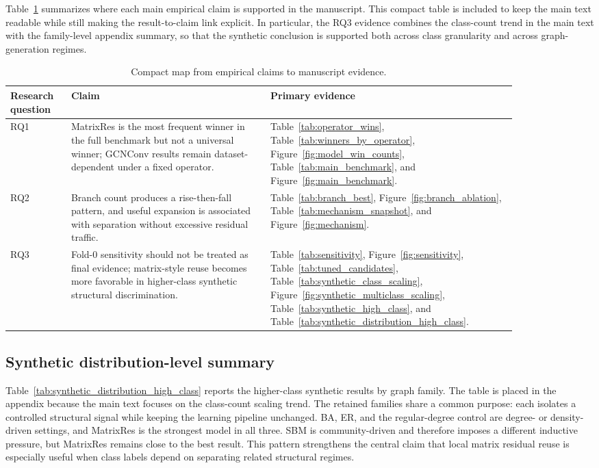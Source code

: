 Table~\ref{tab:evidence_map} summarizes where each main empirical claim is supported in the manuscript. This compact table is included to keep the main text readable while still making the result-to-claim link explicit. In particular, the RQ3 evidence combines the class-count trend in the main text with the family-level appendix summary, so that the synthetic conclusion is supported both across class granularity and across graph-generation regimes.

\begin{table}[!htbp]
\centering
\small
\caption{Compact map from empirical claims to manuscript evidence.}
\label{tab:evidence_map}
\begin{tabular}{p{0.10\linewidth} p{0.34\linewidth} p{0.42\linewidth}}
\toprule
Research question & Claim & Primary evidence \\
\midrule
RQ1 & MatrixRes is the most frequent winner in the full benchmark but not a universal winner; GCNConv results remain dataset-dependent under a fixed operator. & Table~\ref{tab:operator_wins}, Table~\ref{tab:winners_by_operator}, Figure~\ref{fig:model_win_counts}, Table~\ref{tab:main_benchmark}, and Figure~\ref{fig:main_benchmark}. \\
RQ2 & Branch count produces a rise-then-fall pattern, and useful expansion is associated with separation without excessive residual traffic. & Table~\ref{tab:branch_best}, Figure~\ref{fig:branch_ablation}, Table~\ref{tab:mechanism_snapshot}, and Figure~\ref{fig:mechanism}. \\
RQ3 & Fold-0 sensitivity should not be treated as final evidence; matrix-style reuse becomes more favorable in higher-class synthetic structural discrimination. & Table~\ref{tab:sensitivity}, Figure~\ref{fig:sensitivity}, Table~\ref{tab:tuned_candidates}, Table~\ref{tab:synthetic_class_scaling}, Figure~\ref{fig:synthetic_multiclass_scaling}, Table~\ref{tab:synthetic_high_class}, and Table~\ref{tab:synthetic_distribution_high_class}. \\
\bottomrule
\end{tabular}
\end{table}

\subsection{Synthetic distribution-level summary}

Table~\ref{tab:synthetic_distribution_high_class} reports the higher-class synthetic results by graph family. The table is placed in the appendix because the main text focuses on the class-count scaling trend. The retained families share a common purpose: each isolates a controlled structural signal while keeping the learning pipeline unchanged. BA, ER, and the regular-degree control are degree- or density-driven settings, and MatrixRes is the strongest model in all three. SBM is community-driven and therefore imposes a different inductive pressure, but MatrixRes remains close to the best result. This pattern strengthens the central claim that local matrix residual reuse is especially useful when class labels depend on separating related structural regimes.

